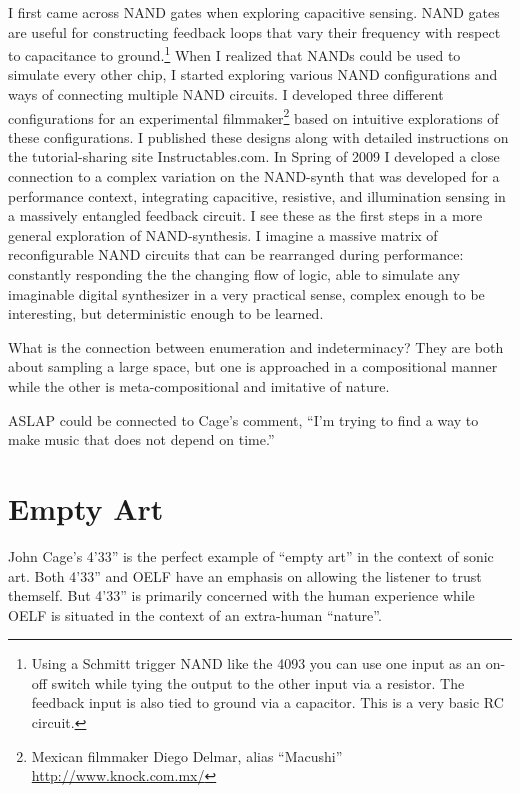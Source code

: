 \documentclass{thesis}
\begin{document}
	I first came across NAND gates when exploring capacitive sensing. NAND gates are useful for constructing feedback loops that vary their frequency with respect to capacitance to ground.\footnote{Using a Schmitt trigger NAND like the 4093 you can use one input as an on-off switch while tying the output to the other input via a resistor. The feedback input is also tied to ground via a capacitor. This is a very basic RC circuit.} When I realized that NANDs could be used to simulate every other chip, I started exploring various NAND configurations and ways of connecting multiple NAND circuits. I developed three different configurations for an experimental filmmaker\footnote{Mexican filmmaker Diego Delmar, alias ``Macushi'' \url{http://www.knock.com.mx/}} based on intuitive explorations of these configurations. I published these designs along with detailed instructions on the tutorial-sharing site Instructables.com. In Spring of 2009 I developed a close connection to a complex variation on the NAND-synth that was developed for a performance context, integrating capacitive, resistive, and illumination sensing in a massively entangled feedback circuit. I see these as the first steps in a more general exploration of NAND-synthesis. I imagine a massive matrix of reconfigurable NAND circuits that can be rearranged during performance: constantly responding the the changing flow of logic, able to simulate any imaginable digital synthesizer in a very practical sense, complex enough to be interesting, but deterministic enough to be learned.
	
	What is the connection between enumeration and indeterminacy? They are both about sampling a large space, but one is approached in a compositional manner while the other is meta-compositional and imitative of nature.
	
	ASLAP could be connected to Cage's comment, ``I'm trying to find a way to make music that does not depend on time.''
	
\section{Empty Art}

	\cite{larry_j_solomon_sounds_1998}
	John Cage's 4'33'' is the perfect example of ``empty art'' in the context of sonic art. Both 4'33'' and OELF have an emphasis on allowing the listener to trust themself. But 4'33'' is primarily concerned with the human experience while OELF is situated in the context of an extra-human ``nature''.
	
\end{document}
